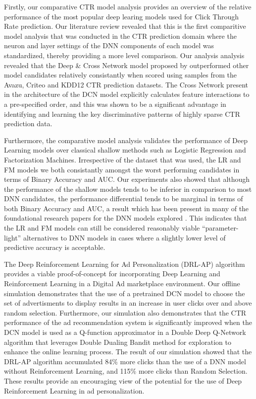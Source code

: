 \documentclass{mldsmsc}
\begin{document}
Firstly, our comparative CTR model analysis provides an overview of the relative
performance of the most popular deep learing models used for Click Through Rate prediction. Our
literature review revealed that this is the first comparitive model analysis that was conducted in 
the CTR prediction domain where the neuron and layer settings of the DNN components of each model
was standardized, thereby providing a more level comparison. Our analysis analysis revealed that the Deep \& Cross Network model proposed
by \citep{RefWorks:wang2017deep} outperformed other model candidates relatively consistantly
when scored using samples from the Avazu, Criteo and KDD12 CTR prediction datasets. The Cross
Network present in the architecture of the DCN model explicitly calculates feature interactions
to a pre-specified order, and this was shown to be a significant advantage in identifying and
learning the key discriminative patterns of highly sparse CTR prediction data.

Furthermore, the comparative model analysis validates the performance of Deep Learning models
over classical shallow methods such as Logistic Regression and Factorization Machines. Irrespective of
the dataset that was used, the LR and FM models we both consistantly amongst the worst performing
candidates in terms of Binary Accuracy and AUC. Our experiments also showed that although the
performance of the shallow models tends to be inferior in comparison to most DNN candidates, 
the performance differential tends to be marginal in terms of both Binary Accuracy and AUC, 
a result which has been present in many of the foundational research papers for the DNN models
explored \citep{RefWorks:guo2017deepfm:,RefWorks:liu2015convolutional,RefWorks:he2017neural}.
This indicates that the LR and FM models can still be considered reasonably viable ``parameter-light''
alternatives to DNN models in cases where a slightly lower level of predictive accuracy is acceptable.

The Deep Reinforcement Learning for Ad Personalization (DRL-AP) algorithm provides a viable
proof-of-concept for incorporating Deep Learning and Reinforcement Learning in a Digital Ad marketplace
environment. Our offline simulation demonstrates that the use of a pretrained DCN model
to choose the set of advertisments to display results in an increase in user clicks over and above
random selection. Furthermore, our simulation also demonstrates that the CTR performance of the ad
recommendation system is significantly improved when the DCN model is used as a Q-function approximator
in a Double Deep Q-Network algorithm that leverages Double Dualing Bandit method for exploration
to enhance the online learning process. The result of our simulation showed that the DRL-AP algorithm
accumulated 84\% more clicks than the use of a DNN model without Reinforcement Learning, and
115\% more clicks than Random Selection. These results provide an encouraging view of the
potential for the use of Deep Reinforcement Learning in ad personalization. 
\end{document}
